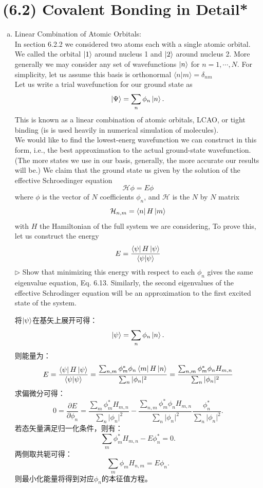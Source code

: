 \documentclass[reqno,a4paper,12pt]{amsart}
\begin{document}
\section{\textbf{(6.2) Covalent Bonding in Detail*}}
\begin{enumerate}[(a)]
	\item Linear Combination of Atomic Orbitals: \\
	In section 6.2.2 we considered two atoms each with a single atomic orbital. We called the orbital $\ket{1}$ around nucleus 1 and $\ket{2}$ around nucleus 2. More generally we may consider any set of wavefunctions $\ket{n}$ for $n = 1,\cdots, N$. For simplicity, let us assume this basis is orthonormal $\langle n \vert m \rangle = \delta_{nm}$ \\
	Let us write a trial wavefunction for our ground state as 
	\[
		\ket{\Psi} = \sum_n \phi_n\ket{n}.
	\]
	This is known as a linear combination of atomic orbitals, LCAO, or tight binding (is is used heavily in numerical simulation of molecules). \\
	We would like to find the lowest-energ wavefunction we can construct in this form, i.e., the best approximation to the actual ground-state wavefunction. (The more states we use in our basis, generally, the more accurate our results will be.) We claim that the ground state us given by the solution of the effective Schroedinger equation 
	\[
		\mathcal{H} \phi = E\phi
	\]
	where $\phi$ is the vector of $N$ coefficients $\phi_n$, and $\mathcal{H}$ is the $N$ by $N$ matrix
	\[
		\mathcal{H}_{n,m} = \bra{n}H\ket{m}
	\]
	with $H$ the Hamiltonian of the full system we are considering, To prove this, let us construct the energy 
	\[
		E = \frac{\bra{\psi} H \ket{\psi}}{\langle \psi \vert \psi \rangle}
	\]
	$\triangleright$ Show that minimizing this energy with respect to each $\phi_n$ gives the same eigenvalue equation, Eq. 6.13. Similarly, the second eigenvalues of the effective Schrodinger equation will be an approximation to the first excited state of the system.
	\begin{tcolorbox}[breakable, colback = black!5!white, colframe = black]
	将$\ket{\psi}$在基矢上展开可得：
	\[
		\ket{\psi} = \sum_n \phi_n \ket{n}.
	\]
	则能量为：
	\[
		E = \frac{\bra{\psi} H \ket{\psi}}{\langle \psi \vert \psi \rangle} = \frac{\sum_{n,m} \phi_m^*\phi_n \bra{m} H \ket{n}}{\sum_n \vert \phi_n \vert^2} = \frac{\sum_{n,m} \phi_m^*\phi_n H_{m,n}}{\sum_n \vert \phi_n \vert^2}
	\]
	求偏微分可得：
	\[
		0 = \frac{\partial E}{\partial \phi_n} = \frac{\sum_m \phi_m^*H_{m,n}}{\sum_n \vert \phi_n \vert^2} - \frac{\sum_{n,m} \phi_m^*\phi_nH_{m,n}}{\sum_n \vert \phi_n \vert^2} \frac{\phi_n^*}{\sum_n \vert \phi_n \vert^2}.
	\]
	若态矢量满足归一化条件，则有：
	\[
		\sum_m \phi_m^* H_{m,n} - E\phi_n^* = 0.
	\]
	两侧取共轭可得：
	\[
		\sum_m \phi_m H_{n,m} = E \phi_n.
	\]
	则最小化能量将得到对应$\phi_n$的本征值方程。
	\end{tcolorbox}
	

\end{enumerate}
\end{document}
